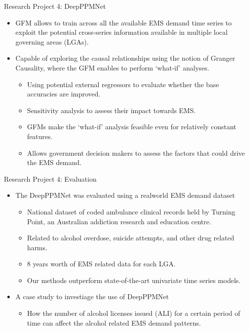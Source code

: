 \documentclass{beamer}
\begin{document}
\begin{frame}{Research Project 4: DeepPPMNet}
	\begin{itemize}
	\item GFM allows to train across all the available EMS demand time series to exploit the potential cross-series information available in multiple local governing areas (LGAs).
	\vspace{4mm}
	\item Capable of exploring the causal relationships using the notion of Granger Causality, where the GFM enables to perform ‘what-if’ analyses.
	\begin{itemize}\color{blue}
		\item Using potential external regressors to evaluate whether the
base accuracies are improved.
		\item Sensitivity analysis to assess their impact towards EMS.
		\item GFMs make the ‘what-if’ analysis feasible even for relatively
constant features.
		\item Allows government decision makers to assess the factors that
could drive the EMS demand.
	\end{itemize}
\end{itemize}
\end{frame} 

\begin{frame}{Research Project 4: Evaluation}
	\begin{itemize}
	\item The DeepPPMNet was evaluated using a realworld EMS demand dataset
	\vspace{1mm}
	\begin{itemize}\color{blue}
		\item National dataset of coded ambulance clinical records held by Turning Point, an Australian addiction research and education centre.
		\item Related to alcohol overdose, suicide attempts, and other drug related harms.
		\item 8 years worth of EMS related data for each LGA.
		\item Our methods outperform state-of-the-art univariate time series models.
	\end{itemize}
	\item A case study to investiage the use of DeepPPMNet
	\vspace{2mm}
	\begin{itemize}\color{blue}
		\item How the number of alcohol licenses issued (ALI) for a certain period of time can affect the alcohol related EMS demand patterns.
	\end{itemize}
\end{itemize}
\end{frame}
\end{document}
